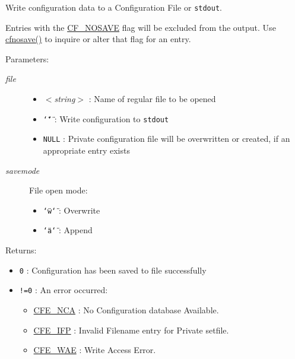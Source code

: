 Write configuration data to a Configuration File or {\tt stdout}. 

Entries with the \hyperlink{group__special__options__mask_gd76153c65f68cc0ee5c1a04c8c3e80bf}{CF\_\-NOSAVE} flag will be excluded from the output. Use \hyperlink{group__setting__saving_g0f6ed90e3ecfa0074af1635a0e4339ef}{cfnosave()} to inquire or alter that flag for an entry.

\begin{Desc}
\item[Parameters:]
\begin{description}
\item[{\em file}]\begin{itemize}
\item $<${\em string$>$\/} : Name of regular file to be opened \item {\tt \char`\"{}\char`\"{}} : Write configuration to {\tt stdout} \item {\tt NULL} : Private configuration file will be overwritten or created, if an appropriate entry exists\end{itemize}
\item[{\em savemode}]File open mode: \begin{itemize}
\item {\tt \char`\"{}w\char`\"{}} : Overwrite \item {\tt \char`\"{}a\char`\"{}} : Append\end{itemize}
\end{description}
\end{Desc}
\begin{Desc}
\item[Returns:]\begin{itemize}
\item {\tt 0} : Configuration has been saved to file successfully \item {\tt !=0} : An error occurred:\begin{itemize}
\item \hyperlink{group__errors_gf8cd36471ddcc549668f49238855609d}{CFE\_\-NCA} : No Configuration database Available. \item \hyperlink{group__errors_g939964b690f63b5484ec40fe8a4a7c56}{CFE\_\-IFP} : Invalid Filename entry for Private setfile. \item \hyperlink{group__errors_gd1375fe531ed1c13233e2fa7ae55534f}{CFE\_\-WAE} : Write Access Error.  \end{itemize}
\end{itemize}
\end{Desc}
